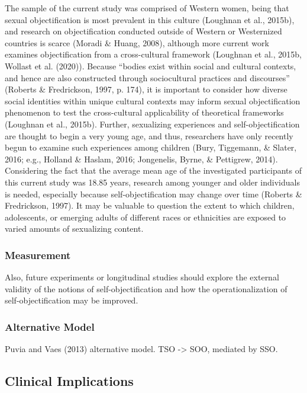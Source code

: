 \documentclass[man]{apa6}
\begin{document}
The sample of the current study was comprised of Western women, being
that sexual objectification is most prevalent in this culture (Loughnan
et al., 2015b), and research on objectification conducted outside of
Western or Westernized countries is scarce (Moradi \& Huang, 2008),
although more current work examines objectification from a
cross-cultural framework (Loughnan et al., 2015b, Wollast et al.
(2020)). Because \enquote{bodies exist within social and cultural
contexts, and hence are also constructed through sociocultural practices
and discourses} (Roberts \& Fredrickson, 1997, p. 174), it is important
to consider how diverse social identities within unique cultural
contexts may inform sexual objectification phenomenon to test the
cross-cultural applicability of theoretical frameworks (Loughnan et al.,
2015b). Further, sexualizing experiences and self-objectification are
thought to begin a very young age, and thus, researchers have only
recently begun to examine such experiences among children (Bury,
Tiggemann, \& Slater, 2016; e.g., Holland \& Haslam, 2016; Jongenelis,
Byrne, \& Pettigrew, 2014). Considering the fact that the average mean
age of the investigated participants of this current study was 18.85
years, research among younger and older individuals is needed,
especially because self-objectification may change over time (Roberts \&
Fredrickson, 1997). It may be valuable to question the extent to which
children, adolescents, or emerging adults of different races or
ethnicities are exposed to varied amounts of sexualizing content.

\subsubsection{Measurement}\label{measurement}

Also, future experiments or longitudinal studies should explore the
external validity of the notions of self-objectification and how the
operationalization of self-objectification may be improved.

\subsubsection{Alternative Model}\label{alternative-model}

Puvia and Vaes (2013) alternative model. TSO -\textgreater{} SOO,
mediated by SSO.

\subsection{Clinical Implications}\label{clinical-implications}
\end{document}
